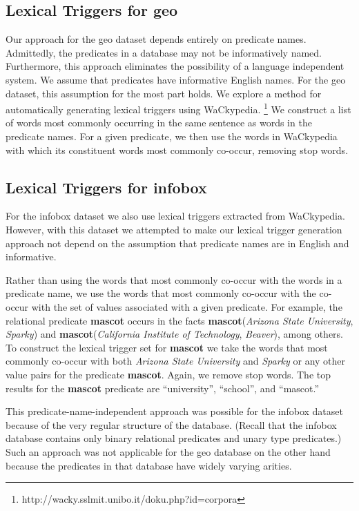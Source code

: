 \documentclass[11pt]{article}
\begin{document}
\subsection{Lexical Triggers for {\sc geo}}
Our approach for the {\sc geo} dataset depends entirely on predicate names. 
Admittedly, the predicates in a database
may not be informatively named. Furthermore, this approach eliminates the
possibility of a language independent system. We assume that predicates have
informative English names. For the {\sc geo} dataset, this assumption
for the most part holds.  We explore a method for automatically generating 
lexical triggers using WaCkypedia.
\footnote{http://wacky.sslmit.unibo.it/doku.php?id=corpora} We construct 
a list of words most commonly occurring in the same sentence as words in the predicate 
names. For a given predicate, we then use the words in WaCkypedia with which its 
constituent words most commonly co-occur, removing stop words. 
 
\subsection{Lexical Triggers for {\sc infobox}}
For the {\sc infobox} dataset we also use lexical triggers
extracted from WaCkypedia. However, with this 
dataset we attempted to make our lexical trigger generation approach not 
depend on the assumption that predicate names are in English and informative.

Rather than
using the words that most commonly co-occur with the words in a predicate name, we
use the words that most commonly co-occur with the co-occur with the set of
values associated with a given predicate. For example, the relational predicate
{\bf mascot} occurs in the facts {\bf mascot}(\emph{Arizona State University},
\emph{Sparky}) and {\bf mascot}(\emph{California Institute of Technology},
\emph{Beaver}), among others. To construct the lexical trigger set for {\bf
mascot} we take the words that most commonly co-occur with both 
\emph{Arizona State University} and \emph{Sparky} or any other value pairs
for the predicate {\bf mascot}. Again, we remove stop words. The top results for
the {\bf mascot} predicate are ``university'', ``school'', and ``mascot.''

This predicate-name-independent approach was possible for the {\sc infobox} 
dataset because of the very regular structure of the database. (Recall that the
{\sc infobox} database contains only binary relational predicates and unary type
predicates.) Such an approach was not applicable for the {\sc geo} database on
the other hand because the predicates in that database have widely varying
arities.  
\end{document}
